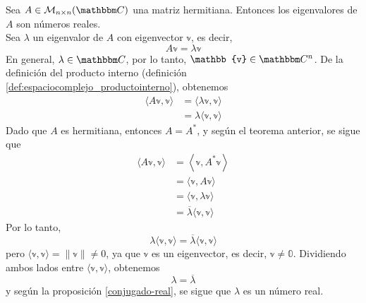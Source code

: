 \begin{theorem}\label{theorem_hermitiana1}
    Sea $A \in \mathcal{M}_{n \times n}(\CC)$ una matriz hermitiana. Entonces los eigenvalores de $A$ son números reales. \\
    \demostracion Sea $\lambda$ un eigenvalor de $A$ con eigenvector $\mathbb{v}$, es decir,
    $$A\mathbb{v} = \lambda \mathbb{v}$$
    En general, $\lambda \in \CC$, por lo tanto, $\mathbb{v} \in \CC[n]$. De la definición del producto interno (definición \ref{def:espaciocomplejo_productointerno}), obtenemos
    \begin{align*}
        \langle A\mathbb{v}, \mathbb{v} \rangle & = \langle \lambda \mathbb{v}, \mathbb{v} \rangle \\
        & = \lambda \langle \mathbb{v}, \mathbb{v} \rangle
    \end{align*}
    Dado que $A$ es hermitiana, entonces $A = A^*$, y según el teorema anterior, se sigue que
    \begin{align*}
        \langle A\mathbb{v}, \mathbb{v} \rangle & = \left\langle \mathbb{v}, A^* \mathbb{v} \right\rangle \\
        & = \langle \mathbb{v}, A\mathbb{v} \rangle \\
        & = \langle \mathbb{v}, \lambda \mathbb{v} \rangle \\
        & = \overline{\lambda} \langle \mathbb{v}, \mathbb{v} \rangle
    \end{align*}
    Por lo tanto,
    $$\lambda \langle \mathbb{v}, \mathbb{v} \rangle = \overline{\lambda} \langle \mathbb{v}, \mathbb{v} \rangle$$\newpage\noindent
    pero $\langle \mathbb{v}, \mathbb{v} \rangle = \| \mathbb{v} \| \neq 0$, ya que $\mathbb{v}$ es un eigenvector, es decir, $\mathbb{v} \neq \mathbb{0}$. Dividiendo ambos lados entre $\langle \mathbb{v}, \mathbb{v} \rangle$, obtenemos
    $$\lambda = \overline{\lambda}$$
    y según la proposición \ref{conjugado-real}, se sigue que $\lambda$ es un número real.
\end{theorem}

